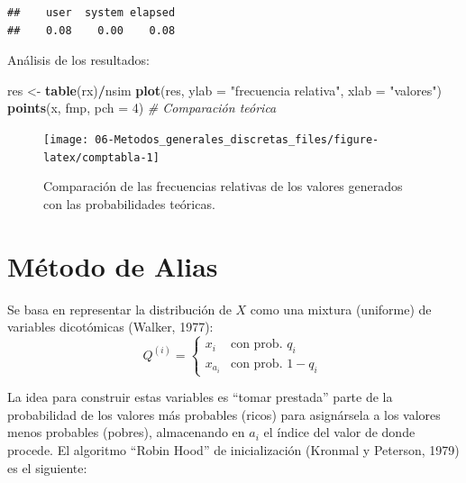 \documentclass[
]{book}
\newenvironment{Shaded}{\begin{snugshade}}{\end{snugshade}}
\newcommand{\CommentTok}[1]{\textcolor[rgb]{0.56,0.35,0.01}{\textit{#1}}}
\newcommand{\DataTypeTok}[1]{\textcolor[rgb]{0.13,0.29,0.53}{#1}}
\newcommand{\DecValTok}[1]{\textcolor[rgb]{0.00,0.00,0.81}{#1}}
\newcommand{\KeywordTok}[1]{\textcolor[rgb]{0.13,0.29,0.53}{\textbf{#1}}}
\newcommand{\NormalTok}[1]{#1}
\newcommand{\OperatorTok}[1]{\textcolor[rgb]{0.81,0.36,0.00}{\textbf{#1}}}
\newcommand{\StringTok}[1]{\textcolor[rgb]{0.31,0.60,0.02}{#1}}
\theoremstyle{break}
\theoremstyle{definition}
\theoremstyle{definition}
\theoremstyle{definition}
\theoremstyle{remark}
\begin{document}
\begin{verbatim}
##    user  system elapsed 
##    0.08    0.00    0.08
\end{verbatim}

Análisis de los resultados:

\begin{Shaded}
\begin{Highlighting}[]
\NormalTok{res <-}\StringTok{ }\KeywordTok{table}\NormalTok{(rx)}\OperatorTok{/}\NormalTok{nsim}
\KeywordTok{plot}\NormalTok{(res, }\DataTypeTok{ylab =} \StringTok{"frecuencia relativa"}\NormalTok{, }\DataTypeTok{xlab =} \StringTok{"valores"}\NormalTok{)}
\KeywordTok{points}\NormalTok{(x, fmp, }\DataTypeTok{pch =} \DecValTok{4}\NormalTok{)  }\CommentTok{# Comparación teórica}
\end{Highlighting}
\end{Shaded}

\begin{figure}[!htb]

{\centering \texttt{[image: 06-Metodos\_generales\_discretas\_files/figure-latex/comptabla-1]} 

}

\caption{Comparación de las frecuencias relativas de los valores generados con las probabilidades teóricas.}\label{fig:comptabla}
\end{figure}

\hypertarget{alias}{%
\section{Método de Alias}\label{alias}}

Se basa en representar la distribución de \(X\) como una mixtura
(uniforme) de variables dicotómicas (Walker, 1977):
\[Q^{(i)}=\left\{ 
\begin{array}{ll}
x_{i} & \text{con prob. } q_{i} \\ 
x_{a_{i}} & \text{con prob. } 1-q_{i}
\end{array}
\ \right.\]

La idea para construir estas variables es ``tomar prestada'' parte de la probabilidad de los valores más probables (ricos) para asignársela a los valores menos probables (pobres), almacenando en \(a_i\) el índice del valor de donde procede.
El algoritmo ``Robin Hood'' de inicialización (Kronmal y Peterson, 1979) es el siguiente:
\end{document}
